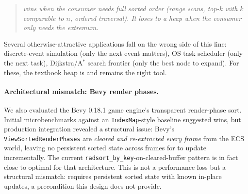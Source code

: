 \begin{quote}\itshape
\DeltaSort wins when the consumer needs full sorted order (range scans,
top-$k$ with $k$ comparable to $n$, ordered traversal). It loses to a heap
when the consumer only needs the extremum.
\end{quote}

Several otherwise-attractive applications fall on the wrong side of this
line: discrete-event simulation (only the next event matters), OS task
scheduler (only the next task), Dijkstra/A$^*$ search frontier (only the
best node to expand). For these, the textbook heap is and remains the
right tool.

\paragraph{Architectural mismatch: Bevy render phases.}
We also evaluated the Bevy 0.18.1 game engine's transparent render-phase
sort. Initial microbenchmarks against an \texttt{IndexMap}-style baseline
suggested \DeltaSort wins, but production integration revealed a structural
issue: Bevy's \texttt{ViewSortedRenderPhases} are \emph{cleared and
re-extracted every frame} from the ECS world, leaving no persistent sorted
state across frames for \DeltaSort to update incrementally. The current
\texttt{radsort\_by\_key}-on-cleared-buffer pattern is in fact close to
optimal for that architecture. This is not a performance loss but a
structural mismatch: \DeltaSort requires persistent sorted state with known
in-place updates, a precondition this design does not provide.
